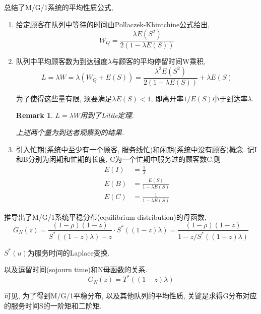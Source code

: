 \documentclass[a4paper, 12pt]{ctexart}
\newtheorem*{remark}{Remark}
\begin{document}
\cite{10}总结了M/G/1系统的平均性质公式,
\begin{enumerate}[1.]

\item 给定顾客在队列中等待的时间由Pollaczek-Khintchine公式给出,
\begin{equation}
\tag{Pollaczek-Khintchine formula}
W_Q=\frac{\lambda E(S^2)}{2(1-\lambda E(S))}
\label{eq:PK}
\end{equation}

\item 队列中平均顾客数为到达强度$\lambda$与顾客的平均停留时间W乘积,
\begin{equation}
L=\lambda W=\lambda (W_Q+E(S))=\frac{\lambda^2 E(S^2)}{2(1-\lambda E(S))}+\lambda E(S)
\end{equation}

为了使得这些量有限, 须要满足$\lambda E(S)<1$, 即离开率$1/E(S)$小于到达率$\lambda$.

\begin{remark}
$L=\lambda W$用到了Little定理.

上述两个量为到达者观察到的结果.
\end{remark}

\item 引入忙期(系统中至少有一个顾客, 服务线忙)和闲期(系统中没有顾客)概念. 记I和B分别为闲期和忙期的长度, C为一个忙期中服务过的顾客数C.则
\begin{align}
E(I)&=\frac{1}{\lambda}\\
E(B)&=\frac{E(S)}{1-\lambda E(S)}\\
E(C)&=\frac{1}{1-\lambda E(S)}
\end{align}

\end{enumerate}

\cite{16}推导出了M/G/1系统平稳分布(equilibrium distribution)的母函数,
\begin{equation}
\tag{eq:ed}
G_N(z)=\frac{(1-\rho)(1-z)}{S^{\ast}((1-z)\lambda)-z}\cdot S^{\ast}((1-z)\lambda)=\frac{(1-\rho)(1-z)}{1-z/S^\ast((1-z)\lambda)}
\end{equation}

$S^\ast (u)$为服务时间的Laplace变换.

以及逗留时间(sojourn time)和N母函数的关系.
\begin{equation}
G_N(z)=T^\ast ((1-z)\lambda)
\end{equation}

可见, 为了得到M/G/1平稳分布, 以及其他队列的平均性质, 关键是求得G分布对应的服务时间S的一阶矩和二阶矩.
\end{document}
